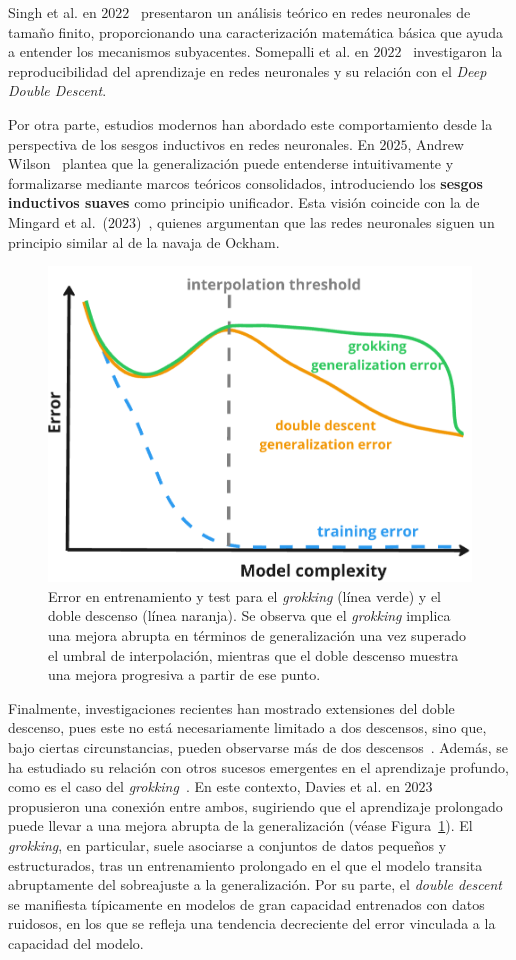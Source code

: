 Singh et al. en $2022$~\cite{Singh2022} presentaron un análisis teórico en redes neuronales de tamaño finito, proporcionando una caracterización matemática básica que ayuda a entender los mecanismos subyacentes. Somepalli et al. en $2022$~\cite{Somepalli2022} investigaron la reproducibilidad del aprendizaje en redes neuronales y su relación con el \textit{Deep Double Descent}.

Por otra parte, estudios modernos han abordado este comportamiento desde la perspectiva de los sesgos inductivos en redes neuronales. En $2025$, Andrew Wilson~\cite{Wilson2025} plantea que la generalización puede entenderse intuitivamente y formalizarse mediante marcos teóricos consolidados, introduciendo los \textbf{sesgos inductivos suaves} como principio unificador. Esta visión coincide con la de Mingard et al.\ ($2023$)~\cite{Mingard2023}, quienes argumentan que las redes neuronales siguen un principio similar al de la navaja de Ockham.

\begin{figure}[h]
    \centering
    \includegraphics[width=0.5\linewidth]{img/grokking.png}
    \caption[\textit{Grokking} y \textit{Deep Double Descent}.]{Error en entrenamiento y test para el \textit{grokking} (línea verde) y el doble descenso (línea naranja). Se observa que el \textit{grokking} implica una mejora abrupta en términos de generalización una vez superado el umbral de interpolación, mientras que el doble descenso muestra una mejora progresiva a partir de ese punto.}\label{fig:grokking}
\end{figure}

Finalmente, investigaciones recientes han mostrado extensiones del doble descenso, pues este no está necesariamente limitado a dos descensos, sino que, bajo ciertas circunstancias, pueden observarse más de dos descensos~\cite{d_Ascoli2021, Chen2021}. Además, se ha estudiado su relación con otros sucesos emergentes en el aprendizaje profundo, como es el caso del \emph{grokking}~\cite{Power2022}. En este contexto, Davies et al. en $2023$~\cite{Davies2023} propusieron una conexión entre ambos, sugiriendo que el aprendizaje prolongado puede llevar a una mejora abrupta de la generalización (véase Figura~\ref{fig:grokking}). El \textit{grokking}, en particular, suele asociarse a conjuntos de datos pequeños y estructurados, tras un entrenamiento prolongado en el que el modelo transita abruptamente del sobreajuste a la generalización. Por su parte, el \textit{double descent} se manifiesta típicamente en modelos de gran capacidad entrenados con datos ruidosos, en los que se refleja una tendencia decreciente del error vinculada a la capacidad del modelo.

